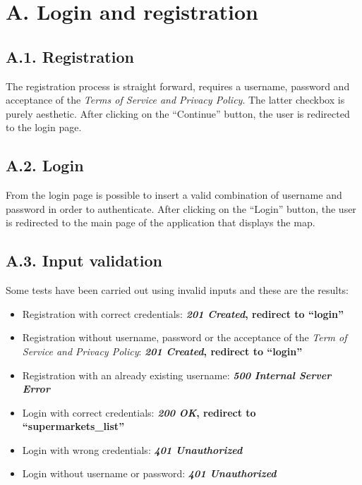 \section{A. Login and registration}

\subsection{A.1. Registration}

The registration process is straight forward, requires a username, password and acceptance of the \emph{Terms of Service and Privacy Policy}. The latter checkbox is purely aesthetic.
After clicking on the ``Continue'' button, the user is redirected to the login page. 

\subsection{A.2. Login}

From the login page is possible to insert a valid combination of username and password in order to authenticate.
After clicking on the ``Login'' button, the user is redirected to the main page of the application that displays the map.

\subsection{A.3. Input validation}

Some tests have been carried out using invalid inputs and these are the results:
\begin{itemize}
    \item Registration with correct credentials: \textbf{\emph{201 Created}, redirect to ``login''}
    \item Registration without username, password or the acceptance of the \emph{Term of Service and Privacy Policy}: \textbf{\emph{201 Created}, redirect to ``login''}
    \item Registration with an already existing username: \textbf{\emph{500 Internal Server Error}}
    \item Login with correct credentials: \textbf{\emph{200 OK}, redirect to ``supermarkets\_list''}
    \item Login with wrong credentials: \textbf{\emph{401 Unauthorized}}
    \item Login without username or password: \textbf{\emph{401 Unauthorized}}
\end{itemize}

